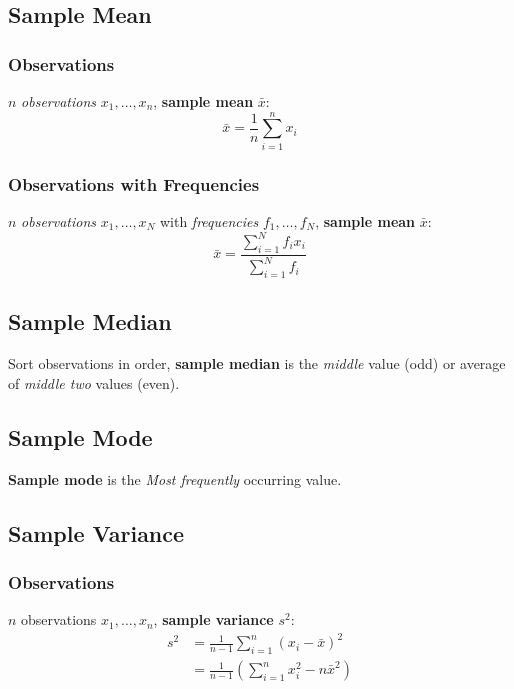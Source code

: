\subsection*{Sample Mean}

\subsubsection*{Observations}

$n$ \textit{observations} $x_1, \dots, x_n$, \textbf{sample mean} $\bar{x}$:
\begin{equation*}
    \bar{x} = \frac{1}{n} \sum \limits_{i = 1}^{n} x_i
\end{equation*}

\subsubsection*{Observations with Frequencies}

$n$ \textit{observations} $x_1, \dots, x_N$ with \textit{frequencies} $f_1, \dots, f_N$, \textbf{sample mean} $\bar{x}$:
\begin{equation*}
    \bar{x} = \frac{
        \sum \limits_{i = 1}^{N} f_i x_i
    }{
        \sum \limits_{i = 1}^{N} f_i
    }
\end{equation*}

\subsection*{Sample Median}

Sort observations in order, \textbf{sample median} is the \textit{middle} value (odd) or average of \textit{middle two} values (even).

\subsection*{Sample Mode}

\textbf{Sample mode} is the \textit{Most frequently} occurring value.

\subsection*{Sample Variance}

\subsubsection*{Observations}

$n$ observations $x_1, \dots, x_n$, \textbf{sample variance} $s^2$:
\begin{align*}
    s^2
    &= \frac{1}{n - 1} \sum \limits_{i = 1}^{n} \left( x_i - \bar{x} \right)^2 \\
    &= \frac{1}{n - 1} \left( \sum \limits_{i = 1}^{n} x_i^2 - n \bar{x}^2 \right)
\end{align*}

